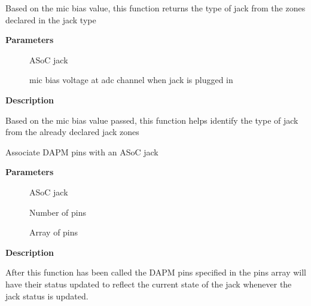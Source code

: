 \documentclass[a4paper,8pt,english]{sphinxmanual}
\begin{document}
\begin{fulllineitems}
\label{sound/kernel-api/alsa-driver-api:c.snd_soc_jack_get_type}
Based on the mic bias value, this function returns the type of jack from the zones declared in the jack type

\end{fulllineitems}


\textbf{Parameters}
\begin{description}
\item[{}] \leavevmode
ASoC jack

\item[{}] \leavevmode
mic bias voltage at adc channel when jack is plugged in

\end{description}

\textbf{Description}

Based on the mic bias value passed, this function helps identify
the type of jack from the already declared jack zones

\begin{fulllineitems}
\label{sound/kernel-api/alsa-driver-api:c.snd_soc_jack_add_pins}
Associate DAPM pins with an ASoC jack

\end{fulllineitems}


\textbf{Parameters}
\begin{description}
\item[{}] \leavevmode
ASoC jack

\item[{}] \leavevmode
Number of pins

\item[{}] \leavevmode
Array of pins

\end{description}

\textbf{Description}

After this function has been called the DAPM pins specified in the
pins array will have their status updated to reflect the current
state of the jack whenever the jack status is updated.
\end{document}
